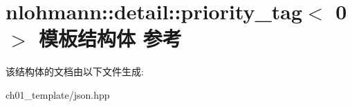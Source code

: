 \hypertarget{structnlohmann_1_1detail_1_1priority__tag_3_010_01_4}{}\section{nlohmann\+::detail\+::priority\+\_\+tag$<$ 0 $>$ 模板结构体 参考}
\label{structnlohmann_1_1detail_1_1priority__tag_3_010_01_4}


该结构体的文档由以下文件生成\+:\begin{DoxyCompactItemize}
\item 
ch01\+\_\+template/json.\+hpp\end{DoxyCompactItemize}
